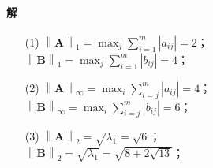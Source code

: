 \documentclass[12pt, a4paper, oneside, fontset=none]{ctexart}
\begin{document}
\paragraph*{解}
\begin{enumerate}
    \item[(1)]
        $\left\lVert \bm{A} \right\rVert _1 = \max_j\sum_{i=1}^m \left\lvert a_{ij} \right\rvert = 2$； \\
        $\left\lVert \bm{B} \right\rVert _1 = \max_j\sum_{i=1}^m \left\lvert b_{ij} \right\rvert = 4$；
    \item[(2)]
        $\left\lVert \bm{A} \right\rVert _\infty = \max_i\sum_{i=j}^m \left\lvert a_{ij} \right\rvert = 4$； \\
        $\left\lVert \bm{B} \right\rVert _\infty = \max_i\sum_{i=j}^m \left\lvert b_{ij} \right\rvert = 6$；
    \item[(3)]
        $\left\lVert \bm{A} \right\rVert _2 = \sqrt{\lambda_1} = \sqrt{6}$； \\
        $\left\lVert \bm{B} \right\rVert _2 = \sqrt{\lambda_1} = \sqrt{8 + 2\sqrt{13}}$；
\end{enumerate}
\end{document}
